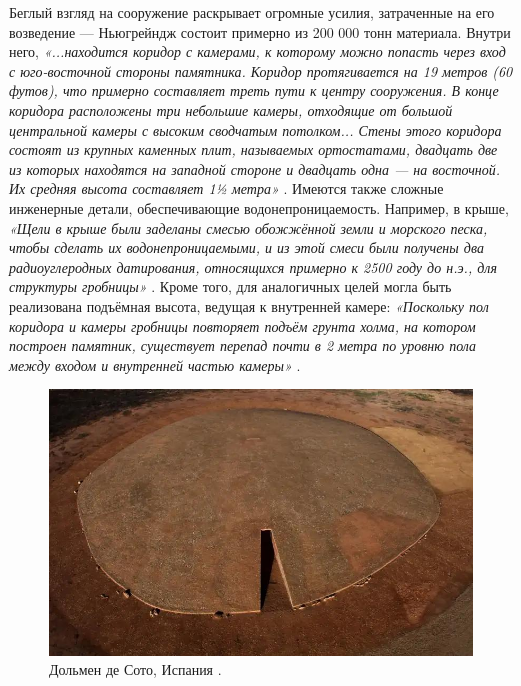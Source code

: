 \documentclass[10pt,twocolumn,letterpaper]{article}
\begin{document}
Беглый взгляд на сооружение раскрывает огромные усилия, затраченные на его возведение — Ньюгрейндж состоит примерно из 200 000 тонн материала. Внутри него, \textit{«...находится коридор с камерами, к которому можно попасть через вход с юго-восточной стороны памятника. Коридор протягивается на 19 метров (60 футов), что примерно составляет треть пути к центру сооружения. В конце коридора расположены три небольшие камеры, отходящие от большой центральной камеры с высоким сводчатым потолком... Стены этого коридора состоят из крупных каменных плит, называемых ортостатами, двадцать две из которых находятся на западной стороне и двадцать одна — на восточной. Их средняя высота составляет 1½ метра»} \cite{70}. Имеются также сложные инженерные детали, обеспечивающие водонепроницаемость. Например, в крыше, \textit{«Щели в крыше были заделаны смесью обожжённой земли и морского песка, чтобы сделать их водонепроницаемыми, и из этой смеси были получены два радиоуглеродных датирования, относящихся примерно к 2500 году до н.э., для структуры гробницы»} \cite{71}. Кроме того, для аналогичных целей могла быть реализована подъёмная высота, ведущая к внутренней камере: \textit{«Поскольку пол коридора и камеры гробницы повторяет подъём грунта холма, на котором построен памятник, существует перепад почти в 2 метра по уровню пола между входом и внутренней частью камеры»} \cite{71}.

\begin{figure}[b]
\begin{center}
   \includegraphics[width=1\linewidth]{dolmen.jpg}
\end{center}
   \caption{Дольмен де Сото, Испания \cite{53}.}
\label{fig:9}
\label{fig:onecol}
\end{figure}
\end{document}
